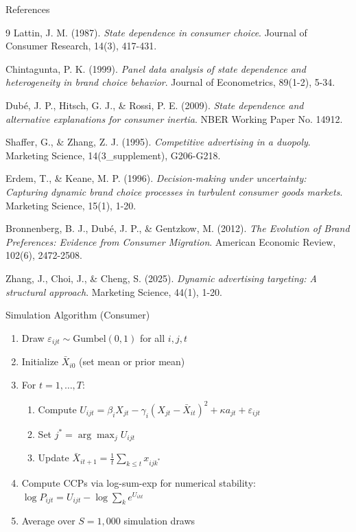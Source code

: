 \documentclass[aspectratio=169,professionalfonts]{beamer}
\begin{document}
\begin{frame}{References}
  \begin{thebibliography}{9}
    \footnotesize
    Lattin, J. M. (1987). \textit{State dependence in consumer choice}. Journal of Consumer Research, 14(3), 417-431.

    Chintagunta, P. K. (1999). \textit{Panel data analysis of state dependence and heterogeneity in brand choice behavior}. Journal of Econometrics, 89(1-2), 5-34.

    Dub\'e, J. P., Hitsch, G. J., \& Rossi, P. E. (2009). \textit{State dependence and alternative explanations for consumer inertia}. NBER Working Paper No. 14912.

    Shaffer, G., \& Zhang, Z. J. (1995). \textit{Competitive advertising in a duopoly}. Marketing Science, 14(3_supplement), G206-G218.

    Erdem, T., \& Keane, M. P. (1996). \textit{Decision-making under uncertainty: Capturing dynamic brand choice processes in turbulent consumer goods markets}. Marketing Science, 15(1), 1-20. 

    Bronnenberg, B. J., Dub\'e, J. P., \& Gentzkow, M. (2012). \textit{The Evolution of Brand Preferences: Evidence from Consumer Migration}. American Economic Review, 102(6), 2472-2508.

    Zhang, J., Choi, J., \& Cheng, S. (2025). \textit{Dynamic advertising targeting: A structural approach}. Marketing Science, 44(1), 1-20.

  \end{thebibliography}
\end{frame}

\begin{frame}{Simulation Algorithm (Consumer)}
  \begin{enumerate}
    \item Draw $\varepsilon_{ijt} \sim \text{Gumbel}(0,1)$ for all $i, j, t$
    \item Initialize $\bar{X}_{i0}$ (set mean or prior mean)
    \item For $t = 1, \ldots, T$:
      \begin{enumerate}
        \item Compute $U_{ijt} = \beta_i X_{jt}
              - \gamma_i (X_{jt} - \bar{X}_{it})^2
              + \kappa a_{jt} + \varepsilon_{ijt}$
        \item Set $j^* = \arg\max_j U_{ijt}$
        \item Update $\bar{X}_{it+1} = \frac{1}{t}\sum_{k \le t} x_{ijk^*}$
      \end{enumerate}
    \item Compute CCPs via log-sum-exp for numerical stability:
          $\log P_{ijt} = U_{ijt} - \log \sum_k e^{U_{ikt}}$
    \item Average over $S = 1{,}000$ simulation draws
  \end{enumerate}
\end{frame}
\end{document}
